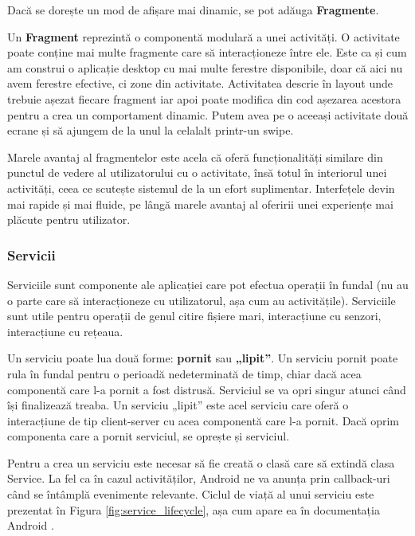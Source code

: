 \documentclass[12pt,a4paper]{article}
\begin{document}
Dacă se dorește un mod de afișare mai dinamic, se pot adăuga \textbf{Fragmente}.

Un \textbf{Fragment} reprezintă o componentă modulară a unei activități. O activitate poate conține mai multe fragmente care să interacționeze între ele. Este ca și cum am construi o aplicație desktop cu mai multe ferestre disponibile, doar că aici nu avem ferestre efective, ci zone din activitate. Activitatea descrie în layout unde trebuie așezat fiecare fragment iar apoi poate modifica din cod așezarea acestora pentru a crea un comportament dinamic. Putem avea pe o aceeași activitate două ecrane și să ajungem de la unul la celalalt printr-un swipe.

Marele avantaj al fragmentelor este acela că oferă funcționalități similare din punctul de vedere al utilizatorului cu o activitate, însă totul în interiorul unei activități, ceea ce scutește sistemul de la un efort suplimentar. Interfețele devin mai rapide și mai fluide, pe lângă marele avantaj al oferirii unei experiențe mai plăcute pentru utilizator.

\subsubsection{Servicii}
Serviciile sunt componente ale aplicației care pot efectua operații în fundal (nu au o parte care să interacționeze cu utilizatorul, așa cum au activitățile). Serviciile sunt utile pentru operații de genul citire fișiere mari, interacțiune cu senzori, interacțiune cu rețeaua.

Un serviciu poate lua două forme: \textbf{pornit} sau \textbf{„lipit”}. Un serviciu pornit poate rula în fundal pentru o perioadă nedeterminată de timp, chiar dacă acea componentă care l-a pornit a fost distrusă. Serviciul se va opri singur atunci când își finalizează treaba. Un serviciu „lipit” este acel serviciu care oferă o interacțiune de tip client-server cu acea componentă care l-a pornit. Dacă oprim componenta care a pornit serviciul, se oprește și serviciul.

Pentru a crea un serviciu este necesar să fie creată o clasă care să extindă clasa Service. La fel ca în cazul activităților, Android ne va anunța prin callback-uri când se întâmplă evenimente relevante. Ciclul de viață al unui serviciu este prezentat în Figura \ref{fig:service_lifecycle}, așa cum apare ea în documentația Android \cite{DeveloperAndroid}.
\end{document}
